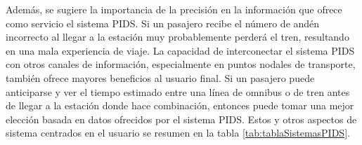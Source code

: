 Además, se sugiere la importancia de la precisión en la información que ofrece como servicio el sistema PIDS. Si un pasajero recibe el número de andén incorrecto al llegar a la estación muy probablemente perderá el tren, resultando en una mala experiencia de viaje. La capacidad de interconectar el sistema PIDS con otros canales de información, especialmente en puntos nodales de transporte, también ofrece mayores beneficios al usuario final. Si un pasajero puede anticiparse y ver el tiempo estimado entre una línea de omnibus o de tren antes de llegar a la estación donde hace combinación, entonces puede tomar una mejor elección basada en datos ofrecidos por el sistema PIDS. Estos y otros aspectos de sistema centrados en el usuario se resumen en la tabla \ref{tab:tablaSistemasPIDS}.\\


